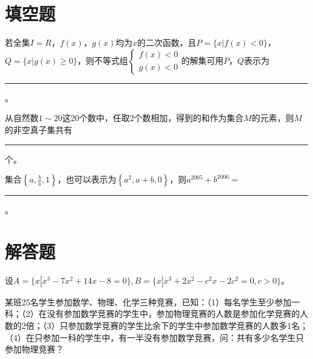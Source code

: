 \documentclass[a4paper,addpoints,11pt]{exam}
\newcommand{\shortanswerline}{\rule[-2pt]{50pt}{0.4pt}}
\begin{document}
\begin{common-format}
\section{填空题}
\begin{questions}
\question
若全集$ I=R $，$ f(x) $，$ g(x) $均为$ x $的二次函数，且$ P=\{x|f(x)<0\} $，$ Q=\{x|g(x)\geqslant 0\}  $，则不等式组$ \begin{cases} f(x)<0 \\ g(x)<0  \end{cases} $的解集可用$ P $，$ Q $表示为\rule[-2pt]{50pt}{0.4pt} 。

\question
从自然数$ 1\sim20 $这20个数中，任取2个数相加，得到的和作为集合$ M $的元素，则$ M $的非空真子集共有\shortanswerline 个。

\question
集合$ \left\{ a, \frac{b}{a}, 1 \right\} $，也可以表示为$ \left\{ a^2, a+b, 0 \right\} $，则$ a^{2005}+b^{2006}= $\shortanswerline 。
\end{questions}




\newpage
\section{解答题}
\begin{questions}
\question
设$ A=\{x|x^3-7x^2+14x-8=0\}, B=\{x|x^3+2x^2-c^2x-2c^2=0, c>0\} $。
\question
某班25名学生参加数学、物理、化学三种竞赛，已知：（1）每名学生至少参加一科；（2）在没有参加数学竞赛的学生中，参加物理竞赛的人数是参加化学竞赛的人数的2倍；（3）只参加数学竞赛的学生比余下的学生中参加数学竞赛的人数多1名；（4）在只参加一科的学生中，有一半没有参加数学竞赛，问：共有多少名学生只参加物理竞赛？
\end{questions}





\end{common-format}
\end{document}
